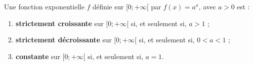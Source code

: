 \documentclass[11pt]{article}
\begin{document}
\begin{prop}
  \begin{minipage}[]{.5\textwidth}
    Une fonction exponentielle $f$ définie sur $[0;+\infty[$ par $f(x)=a^x$,
      avec $a>0$ est :
      \begin{enumerate}
        \item \textbf{strictement croissante} sur $[0;+\infty[$ si, et seulement
            si, $a>1$ ;
        \item \textbf{strictement décroissante} sur $[0;+\infty[$ si, et seulement
            si, $0<a<1$ ;
          \item \textbf{constante} sur $[0;+\infty[$ si, et seulement si, $a=1$.
      \end{enumerate}
  \end{minipage}
  \begin{minipage}[]{.5\textwidth}
    \begin{center}
    \end{center}
  \end{minipage}
\end{prop}
\end{document}

